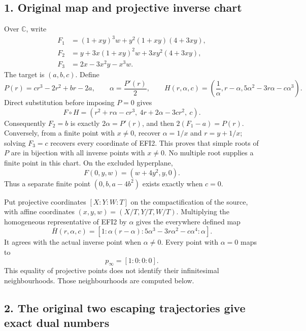 \documentclass[
  10pt,
  a4paper,
]{article}
\begin{document}
\subsection{1. Original map and projective inverse
chart}\label{original-map-and-projective-inverse-chart}

Over \(\mathbb C\), write \[
\begin{aligned}
F_1&=(1+xy)^3w+y^2(1+xy)(4+3xy),\\
F_2&=y+3x(1+xy)^2w+3xy^2(4+3xy),\\
F_3&=2x-3x^2y-x^3w.
\end{aligned}
\tag{EFI1}
\] The target is \((a,b,c)\). Define \[
P(r)=cr^3-2r^2+br-2a,\qquad
\alpha=\frac{P'(r)}2,\qquad
H(r,\alpha,c)=\left(\frac1\alpha,r-\alpha,
5\alpha^2-3r\alpha-c\alpha^3\right).
\tag{EFI2}
\] Direct substitution before imposing \(P=0\) gives \[
F\circ H=(r^2+r\alpha-cr^3,\ 4r+2\alpha-3cr^2,\ c).
\tag{EFI3}
\] Consequently \(F_2=b\) is exactly \(2\alpha=P'(r)\), and then
\(2(F_1-a)=P(r)\). Conversely, from a finite point with \(x\ne0\),
recover \(\alpha=1/x\) and \(r=y+1/x\); solving \(F_3=c\) recovers every
coordinate of EFI2. This proves that simple roots of \(P\) are in
bijection with all inverse points with \(x\ne0\). No multiple root
supplies a finite point in this chart. On the excluded hyperplane, \[
F(0,y,w)=(w+4y^2,y,0).
\tag{EFI4}
\] Thus a separate finite point \((0,b,a-4b^2)\) exists exactly when
\(c=0\).

Put projective coordinates \([X:Y:W:T]\) on the compactification of the
source, with affine coordinates \((x,y,w)=(X/T,Y/T,W/T)\). Multiplying
the homogeneous representative of EFI2 by \(\alpha\) gives the
everywhere defined map \[
\overline H(r,\alpha,c)=
[1:\alpha(r-\alpha):5\alpha^3-3r\alpha^2-c\alpha^4:\alpha].
\tag{EFI5}
\] It agrees with the actual inverse point when \(\alpha\ne0\). Every
point with \(\alpha=0\) maps to \[
p_\infty=[1:0:0:0].
\tag{EFI6}
\] This equality of projective points does not identify their
infinitesimal neighbourhoods. Those neighbourhoods are computed below.

\subsection{2. The original two escaping trajectories give exact dual
numbers}\label{the-original-two-escaping-trajectories-give-exact-dual-numbers}
\end{document}
